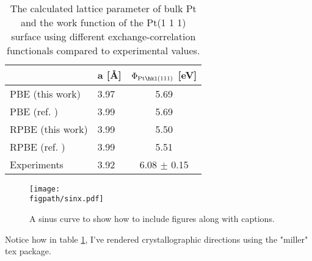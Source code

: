 \begin{table}[!tbh]
\begin{center}
  \begin{tabular}{llc}
  \toprule
       &  a [\AA{}]  &  $\Phi\mathrm{_{Pt\hkl(111)}}$ [eV]  \\
  \midrule
  PBE (this work) &  3.97  &    5.69  \\
  PBE (ref. \cite{Singh-miller2009}) & 3.99  &    5.69   \\
  RPBE (this work) &  3.99 &   5.50 \\
  RPBE (ref. \cite{Sakong2018})&  3.99 &   5.51 \\
  Experiments &  3.92 \cite{Kittel1976} &   6.08 $\pm$ 0.15 \cite{Salmeron1983} \\
  \bottomrule
  \end{tabular}
\end{center}
\caption[Calculated lattice parameter of Pt and work function of the Pt\hkl(1 1 1) surface.]{The calculated lattice parameter of bulk Pt and the work function of the Pt\hkl(1 1 1) surface using different exchange-correlation functionals compared to experimental values.}
\label{main_tab1}
\end{table}

\begin{figure}[!tbh]
\centering
\texttt{[image: \\figpath/sinx.pdf]}
\caption[A sinus curve]{A sinus curve to show how to include figures along with captions.} %
\label{main_fig1}
\end{figure}

Notice how in table \ref{main_tab1}, I've rendered crystallographic directions using the "miller" tex package.
